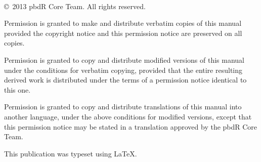 \documentclass[a4paper,11pt]{article}
\begin{document}
\date{}
\maketitle

\ \vfill

\copyright\ 2013 pbdR Core Team.  All rights reserved.

Permission is granted to make and distribute verbatim copies of this manual provided the copyright notice and this permission notice are preserved on all copies.

Permission is granted to copy and distribute modified versions of this manual under the conditions for verbatim copying, provided that the entire resulting derived work is distributed under the terms of a permission notice identical to this one.

Permission is granted to copy and distribute translations of this manual into another language, under the above conditions for modified versions, except that this permission notice may be stated in a translation approved by the pbdR Core Team. 

This publication was typeset using \LaTeX.  


\newpage
{}
\fancyhf[R]{\thepage }
\fancyfoot{}
\tableofcontents


\newpage
{}
\setcounter{page}{1}
\pagestyle{fancy}

\bodyheadfoot








\end{document}
